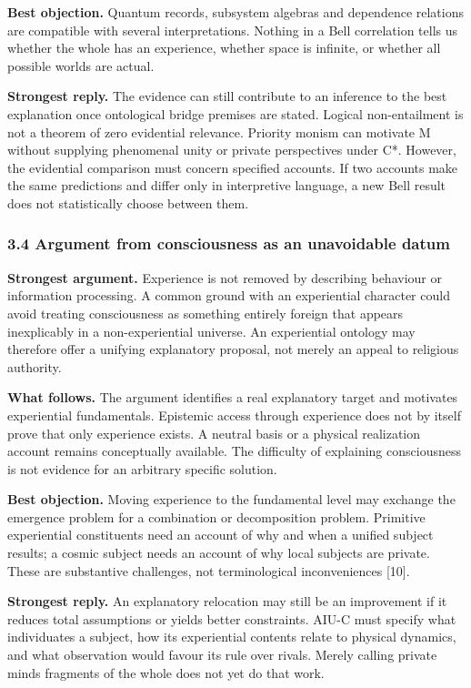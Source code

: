 \documentclass[
  10pt,
  a4paper,
]{article}
\begin{document}
\textbf{Best objection.} Quantum records, subsystem algebras and
dependence relations are compatible with several interpretations.
Nothing in a Bell correlation tells us whether the whole has an
experience, whether space is infinite, or whether all possible worlds
are actual.

\textbf{Strongest reply.} The evidence can still contribute to an
inference to the best explanation once ontological bridge premises are
stated. Logical non-entailment is not a theorem of zero evidential
relevance. Priority monism can motivate M without supplying phenomenal
unity or private perspectives under C*. However, the evidential
comparison must concern specified accounts. If two accounts make the
same predictions and differ only in interpretive language, a new Bell
result does not statistically choose between them.

\subsubsection{3.4 Argument from consciousness as an unavoidable
datum}\label{argument-from-consciousness-as-an-unavoidable-datum}

\textbf{Strongest argument.} Experience is not removed by describing
behaviour or information processing. A common ground with an
experiential character could avoid treating consciousness as something
entirely foreign that appears inexplicably in a non-experiential
universe. An experiential ontology may therefore offer a unifying
explanatory proposal, not merely an appeal to religious authority.

\textbf{What follows.} The argument identifies a real explanatory target
and motivates experiential fundamentals. Epistemic access through
experience does not by itself prove that only experience exists. A
neutral basis or a physical realization account remains conceptually
available. The difficulty of explaining consciousness is not evidence
for an arbitrary specific solution.

\textbf{Best objection.} Moving experience to the fundamental level may
exchange the emergence problem for a combination or decomposition
problem. Primitive experiential constituents need an account of why and
when a unified subject results; a cosmic subject needs an account of why
local subjects are private. These are substantive challenges, not
terminological inconveniences {[}10{]}.

\textbf{Strongest reply.} An explanatory relocation may still be an
improvement if it reduces total assumptions or yields better
constraints. AIU-C must specify what individuates a subject, how its
experiential contents relate to physical dynamics, and what observation
would favour its rule over rivals. Merely calling private minds
fragments of the whole does not yet do that work.
\end{document}

